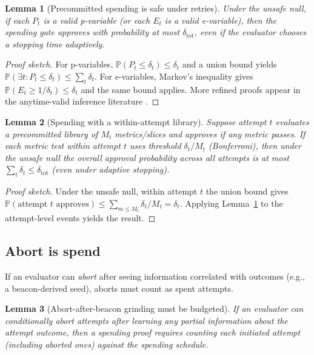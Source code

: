 \documentclass[11pt]{article}
\newtheorem{lemma}{Lemma}
\newcommand{\Pp}{\mathbb{P}}
\begin{document}
\begin{lemma}[Precommitted spending is safe under retries]\label{lem:precommit}
Under the unsafe null, if each $P_t$ is a valid p-variable (or each $E_t$ is a valid e-variable),
then the spending gate approves with probability at most $\delta_{\text{tot}}$, even if the evaluator chooses a stopping time adaptively.
\end{lemma}

\begin{proof}[Proof sketch]
For p-variables, $\Pp(P_t \le \delta_t)\le \delta_t$ and a union bound yields $\Pp(\exists t: P_t\le \delta_t)\le \sum_t \delta_t$.
For e-variables, Markov's inequality gives $\Pp(E_t \ge 1/\delta_t)\le \delta_t$ and the same bound applies.
More refined proofs appear in the anytime-valid inference literature \cite{ramdas2023gts_savi}.
\end{proof}

\begin{lemma}[Spending with a within-attempt library]\label{lem:within_attempt}
Suppose attempt $t$ evaluates a precommitted library of $M_t$ metrics/slices and approves if \emph{any} metric passes.
If each metric test within attempt $t$ uses threshold $\delta_t/M_t$ (Bonferroni), then under the unsafe null the overall approval probability across all attempts is at most $\sum_t \delta_t \le \delta_{\mathrm{tot}}$ (even under adaptive stopping).
\end{lemma}

\begin{proof}[Proof sketch]
Under the unsafe null, within attempt $t$ the union bound gives
$\Pp(\text{attempt $t$ approves}) \le \sum_{m\le M_t} \delta_t/M_t = \delta_t$.
Applying Lemma~\ref{lem:precommit} to the attempt-level events yields the result.
\end{proof}



\subsection{Abort is spend}
If an evaluator can \emph{abort} after seeing information correlated with outcomes (e.g., a beacon-derived seed),
aborts must count as spent attempts.

\begin{lemma}[Abort-after-beacon grinding must be budgeted]\label{lem:abort}
If an evaluator can conditionally abort attempts after learning any partial information about the attempt outcome,
then a spending proof requires counting each initiated attempt (including aborted ones) against the spending schedule.
\end{lemma}
\end{document}

